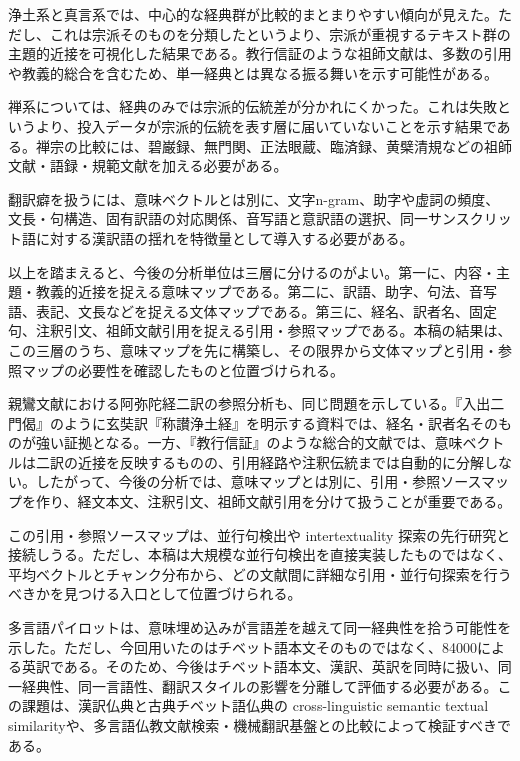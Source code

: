 \documentclass[uplatex,dvipdfmx,11pt,a4paper]{jsarticle}
\begin{document}
浄土系と真言系では、中心的な経典群が比較的まとまりやすい傾向が見えた。ただし、これは宗派そのものを分類したというより、宗派が重視するテキスト群の主題的近接を可視化した結果である。教行信証のような祖師文献は、多数の引用や教義的総合を含むため、単一経典とは異なる振る舞いを示す可能性がある。

禅系については、経典のみでは宗派的伝統差が分かれにくかった。これは失敗というより、投入データが宗派的伝統を表す層に届いていないことを示す結果である。禅宗の比較には、碧巌録、無門関、正法眼蔵、臨済録、黄檗清規などの祖師文献・語録・規範文献を加える必要がある。

翻訳癖を扱うには、意味ベクトルとは別に、文字n-gram、助字や虚詞の頻度、文長・句構造、固有訳語の対応関係、音写語と意訳語の選択、同一サンスクリット語に対する漢訳語の揺れを特徴量として導入する必要がある。

以上を踏まえると、今後の分析単位は三層に分けるのがよい。第一に、内容・主題・教義的近接を捉える意味マップである。第二に、訳語、助字、句法、音写語、表記、文長などを捉える文体マップである。第三に、経名、訳者名、固定句、注釈引文、祖師文献引用を捉える引用・参照マップである。本稿の結果は、この三層のうち、意味マップを先に構築し、その限界から文体マップと引用・参照マップの必要性を確認したものと位置づけられる。

親鸞文献における阿弥陀経二訳の参照分析も、同じ問題を示している。『入出二門偈』のように玄奘訳『称讃浄土経』を明示する資料では、経名・訳者名そのものが強い証拠となる。一方、『教行信証』のような総合的文献では、意味ベクトルは二訳の近接を反映するものの、引用経路や注釈伝統までは自動的に分解しない。したがって、今後の分析では、意味マップとは別に、引用・参照ソースマップを作り、経文本文、注釈引文、祖師文献引用を分けて扱うことが重要である。

この引用・参照ソースマップは、並行句検出や intertextuality 探索の先行研究\cite{nehrdich2020,dharmanexus}と接続しうる。ただし、本稿は大規模な並行句検出を直接実装したものではなく、平均ベクトルとチャンク分布から、どの文献間に詳細な引用・並行句探索を行うべきかを見つける入口として位置づけられる。

多言語パイロットは、意味埋め込みが言語差を越えて同一経典性を拾う可能性を示した。ただし、今回用いたのはチベット語本文そのものではなく、84000による英訳である。そのため、今後はチベット語本文、漢訳、英訳を同時に扱い、同一経典性、同一言語性、翻訳スタイルの影響を分離して評価する必要がある。この課題は、漢訳仏典と古典チベット語仏典の cross-linguistic semantic textual similarity\cite{felbur2022}や、多言語仏教文献検索・機械翻訳基盤\cite{mitra2026}との比較によって検証すべきである。
\end{document}
